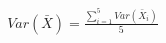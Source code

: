 \documentclass[preview]{standalone}
\begin{document}
\begin{align*}
Var(\bar{X}) = \frac{\sum_{i=1}^{5}Var(\bar{X}_i)}{5}
\end{align*}
\end{document}
